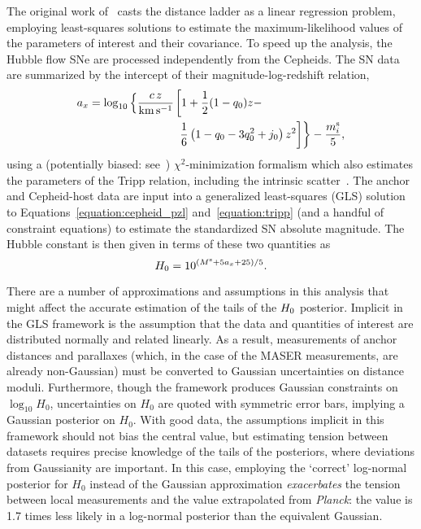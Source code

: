 \documentclass[a4paper,fleqn,usenatbib]{mnras}
\newcommand{\Mstds}{\ensuremath{M^{\rm s}}}
\newcommand{\msup}{\ensuremath{m_i^{\rm s}}}
\newcommand{\decel}{\ensuremath{q_0}}
\begin{document}
{The original work of~\cite{Riess_etal:2009,Riess_etal:2011,Riess_etal:2016} casts the distance ladder as a linear regression problem, employing least-squares solutions to estimate the maximum-likelihood values of the parameters of interest and their covariance. To speed up the analysis, the Hubble flow SNe are processed independently from the Cepheids. The SN data are summarized by the intercept of their magnitude-log-redshift relation,
\begin{align}
a_x = \log_{10} \left\{ \frac{c\,z}{\rm km\,s^{-1}} \right. & \bigg[ 1 + \frac{1}{2}(1 - \decel) z - \nonumber\\
& \left.\left. \frac{1}{6}\left(1 - \decel - 3\decel ^ 2 + j_0\right) z^2 \right] \right\} - \frac{\msup}{5},
\end{align}
using a (potentially biased: see~\citealt{Kelly:2007,March_etal:2011,Mandel_etal:2016}) $\chi^2$-minimization formalism which also estimates the parameters of the Tripp relation, including the intrinsic scatter~\citep{Marriner_etal:2011}. The anchor and Cepheid-host data are input into a generalized least-squares (GLS) solution to Equations~\ref{equation:cepheid_pzl} and~\ref{equation:tripp} (and a handful of constraint equations) to estimate the standardized SN absolute magnitude. The Hubble constant is then given in terms of these two quantities as
\begin{equation}
\hubble = 10^{(\Mstds + 5a_x + 25) / 5}.
\end{equation}

There are a number of approximations and assumptions in this analysis that might affect the accurate estimation of the tails of the $H_0$ posterior. Implicit in the GLS framework is the assumption that the data and quantities of interest are distributed normally and related linearly. As a result, measurements of anchor distances and parallaxes (which, in the case of the MASER measurements, are already non-Gaussian) must be converted to Gaussian uncertainties on distance moduli. Furthermore, though the framework produces Gaussian constraints on $\log_{10} H_0$, uncertainties on $H_0$ are quoted with symmetric error bars, implying a Gaussian posterior on $H_0$. With good data, the assumptions implicit in this framework should not bias the central value, but estimating tension between datasets requires precise knowledge of the tails of the posteriors, where deviations from Gaussianity are important. In this case, employing the `correct' log-normal posterior for $H_0$ instead of the Gaussian approximation {\em exacerbates} the tension between local measurements and the value extrapolated from {\it Planck}: the \citet{Planck_Int_XLVI:2016} value is 1.7 times less likely in a log-normal posterior than the equivalent Gaussian.

}
\end{document}

